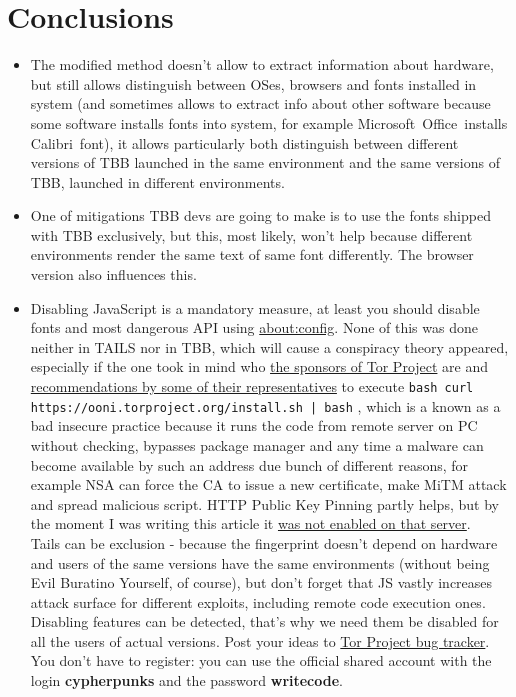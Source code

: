 \documentclass[letterpaper,14pt]{article}
\begin{document}
\section{Conclusions}\label{conclusions}

\begin{itemize}
\itemsep1pt\parskip0pt
\item
  The modified method doesn't allow to extract information about hardware, but still allows distinguish between OSes, browsers and fonts installed in system (and sometimes allows to extract info about other software because some software installs fonts into system, for example Microsoft\texttrademark\ Office\texttrademark\ installs Calibri\texttrademark\ font), it allows particularly both distinguish between different versions of TBB launched in the same environment and the same versions of TBB, launched in different environments.
\item
  One of mitigations TBB devs are going to make is to use the fonts shipped with TBB exclusively, but this, most likely, won't help because different environments render the same text of same font differently. The browser version also influences this.
\item
  Disabling JavaScript is a mandatory measure, at least you should disable fonts and most dangerous API using \url{about:config}. None of this was done neither in TAILS nor in TBB, which will cause a conspiracy theory appeared, especially if the one took in mind who \href{https://www.torproject.org/about/sponsors.htmml.en}{the sponsors of Tor Project} are and \href{https://www.youtube.com/watch?v=pRrFWwA-47U\&t=21m39s}{recommendations by some of their representatives} to execute
  \lstinline!bash curl https://ooni.torproject.org/install.sh | bash!
  , which is a known as a bad insecure practice because it runs the code from remote server on PC without checking, bypasses package manager and any time a malware can become available by such an address due bunch of different reasons, for example NSA can force the CA to issue a new certificate, make MiTM attack and spread malicious script. HTTP Public Key Pinning partly helps, but by the moment I was writing this article it \href{https://www.ssllabs.com/ssltest/analyze.html?d=torproject.org}{was not enabled on that server}.\\
  Tails can be exclusion - because the fingerprint doesn't depend on hardware and users of the same versions have the same environments (without being Evil Buratino Yourself, of course), but don't forget that JS vastly increases attack surface for different exploits, including remote code execution ones. Disabling features can be detected, that's why we need them be disabled for all the users of actual versions. Post your ideas to \href{https://trac.torproject.org/}{Tor Project bug tracker}. You don't have to register: you can use the official shared account with the login \textbf{cypherpunks} and the password \textbf{writecode}.

\end{itemize}
\end{document}
